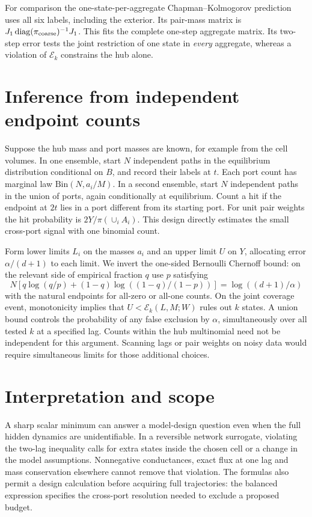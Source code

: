 \documentclass[11pt]{article}
\newcommand{\E}{\mathcal E}
\begin{document}
For comparison the one-state-per-aggregate Chapman--Kolmogorov prediction uses all six labels, including the exterior. Its pair-mass matrix is \(J_1\operatorname{diag}(\pi_{\rm coarse})^{-1}J_1\). This fits the complete one-step aggregate matrix. Its two-step error tests the joint restriction of one state in \emph{every} aggregate, whereas a violation of \(\E_k\) constrains the hub alone.



\section{Inference from independent endpoint counts}
Suppose the hub mass and port masses are known, for example from the cell volumes. In one ensemble, start \(N\) independent paths in the equilibrium distribution conditional on \(B\), and record their labels at \(t\). Each port count has marginal law \(\mathrm{Bin}(N,a_i/M)\). In a second ensemble, start \(N\) independent paths in the union of ports, again conditionally at equilibrium. Count a hit if the endpoint at \(2t\) lies in a port different from its starting port. For unit pair weights the hit probability is \(2Y/\pi(\cup_i A_i)\). This design directly estimates the small cross-port signal with one binomial count.

Form lower limits \(L_i\) on the masses \(a_i\) and an upper limit \(U\) on \(Y\), allocating error \(\alpha/(d+1)\) to each limit. We invert the one-sided Bernoulli Chernoff bound: on the relevant side of empirical fraction \(q\) use \(p\) satisfying
\[
 N\left[q\log(q/p)+(1-q)\log((1-q)/(1-p))\right]
 =\log((d+1)/\alpha)
\]
with the natural endpoints for all-zero or all-one counts. On the joint coverage event, monotonicity implies that \(U<\E_k(L,M;W)\) rules out \(k\) states. A union bound controls the probability of any false exclusion by \(\alpha\), simultaneously over all tested \(k\) at a specified lag. Counts within the hub multinomial need not be independent for this argument. Scanning lags or pair weights on noisy data would require simultaneous limits for those additional choices.





\section{Interpretation and scope}
A sharp scalar minimum can answer a model-design question even when the full hidden dynamics are unidentifiable. In a reversible network surrogate, violating the two-lag inequality calls for extra states inside the chosen cell or a change in the model assumptions. Nonnegative conductances, exact flux at one lag and mass conservation elsewhere cannot remove that violation. The formulas also permit a design calculation before acquiring full trajectories: the balanced expression specifies the cross-port resolution needed to exclude a proposed budget.
\end{document}

